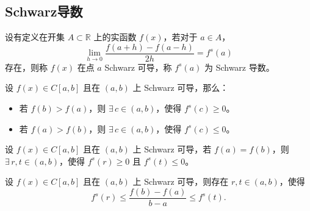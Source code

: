 \documentclass[lang=cn,10pt,thmcnt=section]{elegantbook}
\begin{document}
\subsection{Schwarz导数}
\begin{definition}
	设有定义在开集 \( A \subset \mathbb{R} \) 上的实函数 \( f(x) \)，若对于 \( a \in A \)，
\[ \lim_{h \to 0} \frac{f(a+h)-f(a-h)}{2h} = f^s(a) \]
存在，则称 \( f(x) \) 在点 \( a \) Schwarz 可导，称 \( f^s(a) \) 为 Schwarz 导数。

\end{definition}
\begin{proposition}
	设 \( f(x) \in C[a,b] \) 且在 \( (a,b) \) 上 Schwarz 可导，那么：
\begin{itemize}
    \item 若 \( f(b) > f(a) \)，则 \( \exists\, c \in (a,b) \)，使得 \( f^s(c) \geq 0 \)。
    \item 若 \( f(a) > f(b) \)，则 \( \exists\, c \in (a,b) \)，使得 \( f^s(c) \leq 0 \)。
\end{itemize}

\end{proposition}
\begin{theorem}
	设 \( f(x) \in C[a, b] \) 且在 \( (a, b) \) 上 Schwarz 可导，若 \( f(a) = f(b) \)，则  
\(\exists\, r, t \in (a, b) \)，使得 \( f^s(r) \geq 0 \) 且 \( f^s(t) \leq 0 \)。

\end{theorem}
\begin{theorem}
	设 \( f(x) \in C[a, b] \) 且在 \( (a, b) \) 上 Schwarz 可导，则存在 \( r, t \in (a, b) \)，使得
\[ f^s(r) \leq \frac{f(b) - f(a)}{b - a} \leq f^s(t). \]
\end{theorem}
\end{document}
